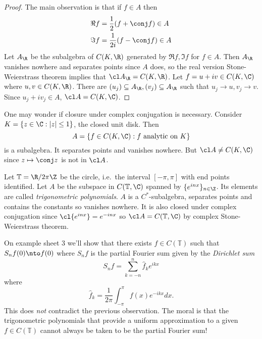 \documentclass[a4paper]{article}
\begin{document}
\begin{proof}
  The main observation is that if \(f \in A\) then
  \begin{align*}
    \Re f &= \frac{1}{2} (f + \conj f) \in A \\
    \Im f &= \frac{1}{2i} (f - \conj f) \in A
  \end{align*}
  Let \(A_\R\) be the subalgebra of \(C(K, \R)\) generated by \(\Re f, \Im f\) for \(f \in A\). Then \(A_\R\) vanishes nowhere and separates points since \(A\) does, so the real version Stone-Weierstrass theorem implies that \(\cl A_\R = C(K, \R)\). Let \(f = u + iv \in C(K, \C)\) where \(u, v \in C(K, \R)\). There are \((u_j) \subseteq A_\R, (v_j) \subseteq A_\R\) such that \(u_j \to u, v_j \to v\). Since \(u_j + iv_j \in A\), \(\cl A = C(K, \C)\).
\end{proof}

\begin{eg}
  One may wonder if closure under complex conjugation is necessary. Consider \(K = \{z \in \C: |z| \leq 1\}\), the closed unit disk. Then
  \[
    A = \{f \in C(K, \C): f \text{ analytic on } K\}
  \]
  is a subalgebra. It separates points and vanishes nowhere. But \(\cl A \neq C(K, \C)\) since \(z \mapsto \conj z\) is not in \(\cl A\).
\end{eg}

\begin{eg}
  Let \(\mathbb T = \R/2\pi\Z\) be the circle, i.e.\ the interval \([-\pi, \pi]\) with end points identified. Let \(A\) be the subspace in \(C(\mathbb T, \C)\) spanned by \(\{e^{inx}\}_{n \in \Z}\). Its elements are called \emph{trigonometric polynomials}. \(A\) is a \(C^*\)-subalgebra, separates points and contains the constants so vanishes nowhere. It is also closed under complex conjugation since \(\cl{e^{inx}} = e^{-inx}\) so \(\cl A = C(\mathbb T, \C)\) by complex Stone-Weierstrass theorem.
\end{eg}

\begin{eg}
  On example sheet 3 we'll show that there exists \(f \in C(\mathbb T)\) such that \(S_nf(0) \nto f(0)\) where \(S_nf\) is the partial Fourier sum given by the \emph{Dirichlet sum}
  \[
    S_nf = \sum_{k = -n}^n \hat f_k e^{ikx}
  \]
  where
  \[
    \hat f_k = \frac{1}{2\pi} \int_{-\pi}^\pi f(x) e^{-ikx} dx.
  \]
  This does \emph{not} contradict the previous observation. The moral is that the trigonometric polynomials that provide a uniform approximation to a given \(f \in C(\mathbb T)\) cannot always be taken to be the partial Fourier sum!
\end{eg}
\end{document}
